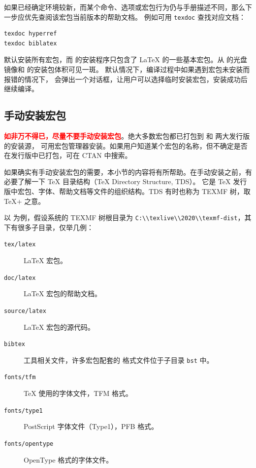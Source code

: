 如果已经确定环境较新，而某个命令、选项或宏包行为仍与手册描述不同，那么下一步应优先查阅该宏包当前版本的帮助文档。
例如可用 \texttt{texdoc} 查找对应文档：
\begin{verbatim}
texdoc hyperref
texdoc biblatex
\end{verbatim}

 默认安装所有宏包，而  的安装程序只包含了 \LaTeX{} 的一些基本宏包。从  的光盘镜像和  的安装包体积可见一斑。
默认情况下，编译过程中如果遇到宏包未安装而报错的情况下， 会弹出一个对话框，让用户可以选择临时安装宏包，安装成功后继续编译。

\subsection{手动安装宏包}\label{subsec:pkg-manual-install}

\textbf{\textcolor{red}{如非万不得已，尽量不要手动安装宏包}}。绝大多数宏包都已打包到  和  两大发行版的安装源，
可用宏包管理器安装。如果用户知道某个宏包的名称，但不确定是否在发行版中已打包，可在 CTAN 中搜索。

如果确实有手动安装宏包的需要，本小节的内容将有所帮助。在手动安装之前，有必要了解一下 \TeX{} 目录结构（\TeX{} Directory Structure, TDS）。
它是 \TeX{} 发行版中宏包、字体、帮助文档等文件的组织结构。TDS 有时也称为 TEXMF 树，取 \TeX$+$ 之意。

以  为例，假设系统的 TEXMF 树根目录为 \nolinkurl{C:\\texlive\\2020\\texmf-dist}，其下有很多子目录，仅举几例：
\begin{description}
  \item[\texttt{tex/latex}] \LaTeX{} 宏包。
  \item[\texttt{doc/latex}] \LaTeX{} 宏包的帮助文档。
  \item[\texttt{source/latex}] \LaTeX{} 宏包的源代码。
  \item[\texttt{bibtex}]  工具相关文件，许多宏包配套的  格式文件位于子目录 \texttt{bst} 中。
  \item[\texttt{fonts/tfm}] \TeX{} 使用的字体文件，TFM 格式。
  \item[\texttt{fonts/type1}] PostScript 字体文件（Type1），PFB 格式。
  \item[\texttt{fonts/opentype}] OpenType 格式的字体文件。
\end{description}

